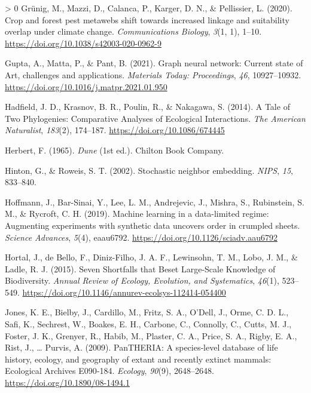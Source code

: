 \documentclass[11pt]{article}
\newlength{\cslhangindent}
\newenvironment{CSLReferences}[3] %
 {%
  \setlength{\parindent}{0pt}
  \ifodd #1 \everypar{\setlength{\hangindent}{\cslhangindent}}\ignorespaces\fi
  \ifnum #2 > 0
  \setlength{\parskip}{#2\baselineskip}
  \fi
 }%
 {}
\begin{document}
\begin{CSLReferences}{1}{0}
\leavevmode\hypertarget{ref-Grunig2020CroFor}{}%
Grünig, M., Mazzi, D., Calanca, P., Karger, D. N., \& Pellissier, L.
(2020). Crop and forest pest metawebs shift towards increased linkage
and suitability overlap under climate change. \emph{Communications
Biology}, \emph{3}(1, 1), 1--10.
\url{https://doi.org/10.1038/s42003-020-0962-9}

\leavevmode\hypertarget{ref-Gupta2021GraNeu}{}%
Gupta, A., Matta, P., \& Pant, B. (2021). Graph neural network: Current
state of Art, challenges and applications. \emph{Materials Today:
Proceedings}, \emph{46}, 10927--10932.
\url{https://doi.org/10.1016/j.matpr.2021.01.950}

\leavevmode\hypertarget{ref-Hadfield2014TalTwo}{}%
Hadfield, J. D., Krasnov, B. R., Poulin, R., \& Nakagawa, S. (2014). A
Tale of Two Phylogenies: Comparative Analyses of Ecological
Interactions. \emph{The American Naturalist}, \emph{183}(2), 174--187.
\url{https://doi.org/10.1086/674445}

\leavevmode\hypertarget{ref-Herbert1965Dun}{}%
Herbert, F. (1965). \emph{Dune} (1st ed.). Chilton Book Company.

\leavevmode\hypertarget{ref-Hinton2002StoNei}{}%
Hinton, G., \& Roweis, S. T. (2002). Stochastic neighbor embedding.
\emph{NIPS}, \emph{15}, 833--840.

\leavevmode\hypertarget{ref-Hoffmann2019MacLea}{}%
Hoffmann, J., Bar-Sinai, Y., Lee, L. M., Andrejevic, J., Mishra, S.,
Rubinstein, S. M., \& Rycroft, C. H. (2019). Machine learning in a
data-limited regime: Augmenting experiments with synthetic data uncovers
order in crumpled sheets. \emph{Science Advances}, \emph{5}(4),
eaau6792. \url{https://doi.org/10.1126/sciadv.aau6792}

\leavevmode\hypertarget{ref-Hortal2015SevSho}{}%
Hortal, J., de Bello, F., Diniz-Filho, J. A. F., Lewinsohn, T. M., Lobo,
J. M., \& Ladle, R. J. (2015). Seven Shortfalls that Beset Large-Scale
Knowledge of Biodiversity. \emph{Annual Review of Ecology, Evolution,
and Systematics}, \emph{46}(1), 523--549.
\url{https://doi.org/10.1146/annurev-ecolsys-112414-054400}

\leavevmode\hypertarget{ref-Jones2009PanSpe}{}%
Jones, K. E., Bielby, J., Cardillo, M., Fritz, S. A., O'Dell, J., Orme,
C. D. L., Safi, K., Sechrest, W., Boakes, E. H., Carbone, C., Connolly,
C., Cutts, M. J., Foster, J. K., Grenyer, R., Habib, M., Plaster, C. A.,
Price, S. A., Rigby, E. A., Rist, J., \ldots{} Purvis, A. (2009).
PanTHERIA: A species‐level database of life history, ecology, and
geography of extant and recently extinct mammals: Ecological Archives
E090‐184. \emph{Ecology}, \emph{90}(9), 2648--2648.
\url{https://doi.org/10.1890/08-1494.1}


\end{CSLReferences}
\end{document}

